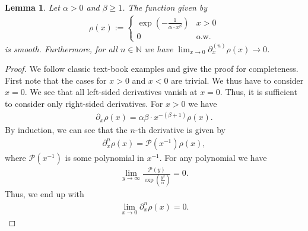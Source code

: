 \documentclass{article}
\newtheorem{lemma}{Lemma}
\begin{document}
\begin{lemma}
\label{lemma:smooth-ramp}
Let $\alpha > 0$ and $\beta \geq 1$. The function given by 
\begin{align}
    \rho(x) := \begin{cases}
        \exp\left(-\frac{1}{\alpha\cdot x^\beta}\right) & x > 0 \\
        0 & \text{o.w.}
    \end{cases}
\end{align}
is smooth. Furthermore, for all $n \in \mathbb{N}$ we have $\lim_{x\rightarrow 0} \partial_{x}^{(n)} \rho(x) \rightarrow 0$.
\end{lemma}
\begin{proof}
    We follow classic text-book examples and give the proof for completeness. First note that the cases for $x > 0$ and $x < 0$ are trivial. We thus have to consider $x = 0$. We see that all left-sided derivatives vanish at $x=0$. Thus, it is sufficient to consider only right-sided derivatives. For $x > 0$ we have
    \begin{align}
        \partial_{x}\rho(x) = \alpha \beta \cdot x^{-(\beta+1)} \rho(x).
    \end{align}
    By induction, we can see that the $n$-th derivative is given by 
    \begin{align}
        \partial^{n}_{x}\rho(x) = \mathcal{P}\left(x^{-1}\right) \rho(x),
    \end{align}
    where $\mathcal{P}\left(x^{-1}\right)$ is some polynomial in $x^{-1}$. For any polynomial we have
    \begin{align}
        \lim_{y\rightarrow\infty} \frac{\mathcal{P}(y)}{\exp\left(\frac{y^{\beta}}{\alpha}\right)} = 0.
    \end{align}
    Thus, we end up with
    \begin{align}
        \lim_{x \rightarrow 0} \partial^{n}_{x}\rho(x) = 0.
    \end{align}
\end{proof}
\end{document}
